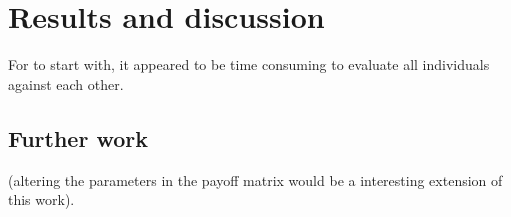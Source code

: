 \section{Results and discussion}\label{sec:results}


For to start with, it appeared to be time consuming to evaluate all individuals against each other. 

\subsection{Further work}
(altering the parameters in the payoff matrix would be a interesting extension of this work).

